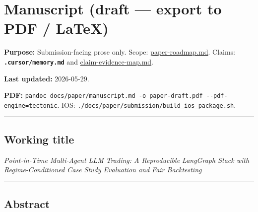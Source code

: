\documentclass[
]{article}
\author{}
\date{}
\begin{document}
\section{Manuscript (draft --- export to PDF /
LaTeX)}\label{manuscript-draft-export-to-pdf-latex}

\textbf{Purpose:} Submission-facing prose only. Scope:
\url{paper-roadmap.md}. Claims: \textbf{\texttt{.cursor/memory.md}} and
\url{claim-evidence-map.md}.

\textbf{Last updated:} 2026-05-29.

\textbf{PDF:}
\texttt{pandoc\ docs/paper/manuscript.md\ -o\ paper-draft.pdf\ -\/-pdf-engine=tectonic}.
IOS: \texttt{./docs/paper/submission/build\_ios\_package.sh}.

\begin{center}\rule{0.5\linewidth}{0.5pt}\end{center}

\subsection{Working title}\label{working-title}

\emph{Point-in-Time Multi-Agent LLM Trading: A Reproducible LangGraph
Stack with Regime-Conditioned Case Study Evaluation and Fair
Backtesting}

\begin{center}\rule{0.5\linewidth}{0.5pt}\end{center}

\subsection{Abstract}\label{abstract}
\end{document}
